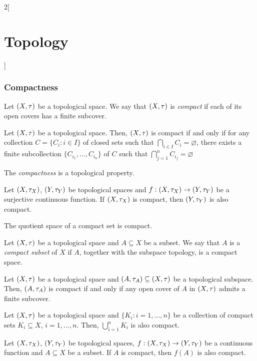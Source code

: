 \documentclass[../../../main.tex]{subfiles}
\begin{document}
\begin{multicols}{2}[\section{Topology}]
    \subsubsection{Compactness}
    \begin{definition}
        Let $(X,\tau)$ be a topological space. We say that $(X,\tau)$ is \emph{compact} if each of its open covers has a finite subcover.
    \end{definition}
    \begin{prop}
        Let $(X,\tau)$ be a topological space. Then, $(X,\tau)$ is compact if and only if for any collection $C=\{C_i:i\in I\}$ of closed sets such that $\bigcap_{i\in I} C_i=\varnothing$, there exists a finite subcollection $\{C_{i_1},\ldots,C_{i_n}\}$ of $C$ such that $\bigcap_{j=1}^n C_{i_j}=\varnothing$
    \end{prop}
    \begin{prop}
        The \emph{compactness} is a topological property.
    \end{prop}
    \begin{prop}
        Let $(X,\tau_X)$, $(Y,\tau_Y)$ be topological spaces and $f:(X,\tau_X)\rightarrow(Y,\tau_Y)$ be a surjective continuous function. If $(X,\tau_X)$ is compact, then $(Y,\tau_Y)$ is also compact.
    \end{prop}
    \begin{corollary}
        The quotient space of a compact set is compact.
    \end{corollary}
    \begin{definition}
        Let $(X,\tau)$ be a topological space and $A\subseteq X$ be a subset. We say that $A$ is a \emph{compact subset} of $X$ if $A$, together with the subspace topology, is a compact space.
    \end{definition}
    \begin{lemma}
        Let $(X,\tau)$ be a topological space and $(A,\tau_A)\subseteq (X,\tau)$ be a topological subspace. Then, $(A,\tau_A)$ is compact if and only if any open cover of $A$ in $(X,\tau)$ admits a finite subcover.
    \end{lemma}
    \begin{prop}
        Let $(X,\tau)$ be a topological space and $\{K_i:i=1,\ldots,n\}$ be a collection of compact sets $K_i\subseteq X$, $i=1,\ldots,n$. Then, $\bigcup_{i=1}^nK_i$ is also compact.
    \end{prop}
    \begin{theorem}
        Let $(X,\tau_X)$, $(Y,\tau_Y)$ be topological spaces, $f:(X,\tau_X)\rightarrow(Y,\tau_Y)$ be a continuous function and $A\subseteq X$ be a subset. If $A$ is compact, then $f(A)$ is also compact.

\end{theorem}
\end{multicols}
\end{document}
